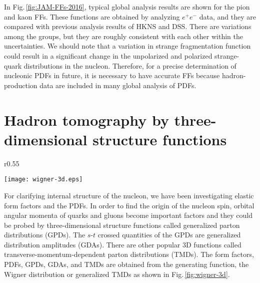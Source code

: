 \documentclass{PoS}
\begin{document}
In Fig.\,\ref{fig:JAM-FFs-2016}, typical global analysis results 
\cite{JAM-FFs-2016} are shown for the pion and kaon FFs. 
These functions are obtained by analyzing $e^+ e^-$ data,
and they are compared with previous analysis results of HKNS and DSS.
There are variations among the groups, but they are roughly consistent
with each other within the uncertainties.
We should note that a variation in strange fragmentation
function could result in a significant change in the unpolarized
and polarized strange-quark distributions in the nucleon.
Therefore, for a precise determination of nucleonic PDFs in future,
it is necessary to have accurate FFs because hadron-production
data are included in many global analysis of PDFs.

\section{Hadron tomography by three-dimensional structure functions}
\label{3d-sfs}

\begin{wrapfigure}[10]{r}{0.55\textwidth}
   \vspace{-0.7cm} 
   \begin{center}
     \texttt{[image: wigner-3d.eps]}
   \end{center}
\vspace{-0.80cm}
\caption{Wigner distribution and 3D structure functions.}
\label{fig:wigner-3d}
\vspace{-0.60cm}
\end{wrapfigure}

For clarifying internal structure of the nucleon, we have been
investigating elastic form factors and the PDFs.
In order to find the origin of the nucleon spin, orbital angular
momenta of quarks and gluons become important factors and they could be
probed by three-dimensional structure functions called
generalized parton distributions (GPDs).
The $s$-$t$ crossed quantities of the GPDs are 
generalized distribution amplitudes (GDAs).
There are other popular 3D functions called
transverse-momentum-dependent parton distributions (TMDs).
The form factors, PDFs, GPDs, GDAs, and TMDs are obtained 
from the generating function, the Wigner distribution
or generalized TMDs as shown in Fig.\,\ref{fig:wigner-3d}.
\end{document}
